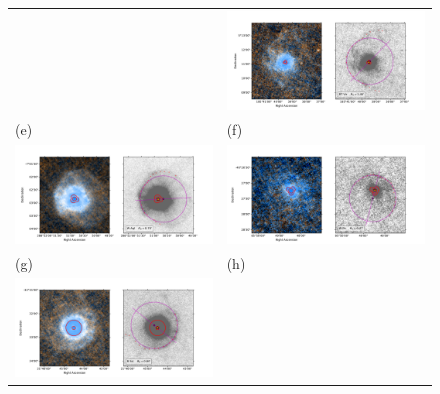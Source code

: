 \begin{figure}
\begin{tabular}{@{}ll@{}}
    & \includegraphics[trim=10 0 60 30, clip]{figs/rtvir-imageplot} \\
    (e) & (f) \\
    \includegraphics[trim=10 0 60 30, clip]{figs/waql-imageplot}
    & \includegraphics[trim=10 0 60 30, clip]{figs/wpic-imageplot} \\
    (g) & (h) \\
    \includegraphics[trim=10 0 60 30, clip]{figs/rscl-imageplot}

\end{tabular}
\end{figure}
